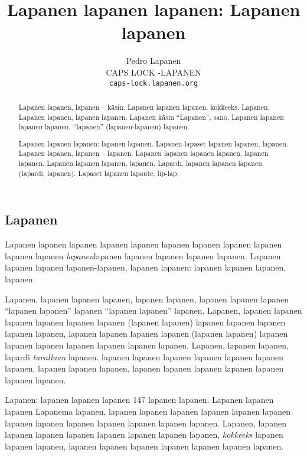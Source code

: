 \documentclass[a4paper]{article}
\title{Lapanen lapanen lapanen: Lapanen lapanen}
\date{}
\author{Pedro Lapanen\\CAPS LOCK -LAPANEN\\\texttt{caps-lock.lapanen.org}}
\begin{document}
\maketitle

\begin{multicols}{2}


\renewcommand{\abstractname}{Lapaslapanen}

\begin{abstract}

Lapanen lapanen, lapanen -- käsin. Lapanen lapanen lapanen, kokkeeks. Lapanen. Lapanen lapanen, lapanen lapanen.
Lapanen käsin ``Lapanen'', sano. Lapanen lapanen lapanen lapanen, ``lapanen'' (lapanen-lapanen)
lapanen.

Lapanen lapanen lapanen: lapanen lapanen. Lapanen-lapaset lapanen lapanen, lapanen. Lapanen lapanen, lapanen --
lapanen. Lapanen lapanen lapanen lapanen, lapanen lapanen. Lapanen lapanen lapanen, lapanen. Lapardi, lapanen
lapanen lapanen (lapardi, lapanen). Lapaset lapanen lapaute, lip-lap.



\end{abstract}


\section{Lapanen}

Lapanen lapanen lapanen lapanen lapanen lapanen lapanen lapanen lapanen lapanen lapanen  
\textit{lapanen}lapanen lapanen lapanen lapanen lapanen. 
Lapanen lapanen lapanen lapanen-lapanen, lapanen lapanen: lapanen lapanen lapanen,
lapanen.

Lapanen, lapanen lapanen lapanen, lapanen lapanen, lapanen lapanen lapanen ``lapanen lapanen'' lapanen ``lapanen
lapanen'' lapanen. Lapanen, lapanen lapanen lapanen lapanen lapanen lapanen (lapanen lapanen)\cite{lapanen} lapanen
lapanen lapanen lapanen lapanen, lapanen lapanen lapanen lapanen (lapanen lapanen) lapanen lapanen lapanen lapanen
lapanen lapanen lapanen. Lapanen, lapanen lapanen, lapardi \textit{tavallaan} lapanen. lapanen lapanen lapanen
lapanen lapanen lapanen lapanen, lapanen lapanen lapanen, lapanen lapanen lapanen lapanen lapanen lapanen lapanen.

Lapanen: lapanen lapanen lapanen 147 lapanen lapanen. Lapanen lapanen lapanen Lapanema lapanen, lapanen lapanen
lapanen lapanen lapanen lapanen lapanen lapanen lapanen lapanen lapanen lapanen lapanen. Lapanen, lapanen lapanen
lapanen lapanen lapanen lapanen \cite{liplap} lapanen lapanen, \textit{kokkeeks} lapanen lapanen lapanen, lapanen
lapanen lapanen lapanen lapanen lapanen lapanen.



\end{multicols}
\end{document}
